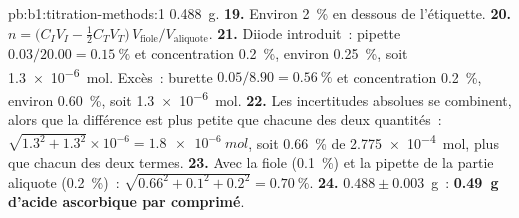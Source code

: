 \begin{solution}{pb:b1:titration-methods:1}
\qty{0.488}{g}.
\textbf{19.} Environ \qty{2}{\percent} en dessous de l'étiquette.
\textbf{20.} $n = \bigl(C_IV_I - \frac12C_TV_T\bigr)\,V_{\mathrm{fiole}}/V_{\mathrm{aliquote}}$.
\textbf{21.} Diiode introduit~: pipette $0.03/20.00 = \qty{0.15}{\percent}$
et concentration \qty{0.2}{\percent}, environ \qty{0.25}{\percent},
soit \qty{1.3e-6}{mol}. Excès~: burette $0.05/8.90 = \qty{0.56}{\percent}$
et concentration \qty{0.2}{\percent}, environ \qty{0.60}{\percent}, soit
\qty{1.3e-6}{mol}.
\textbf{22.} Les incertitudes absolues se combinent, alors que la
différence est plus petite que chacune des deux quantités~:
$\sqrt{1.3^2 + 1.3^2} \times 10^{-6} =
\qty{1.8e-6}{mol}$, soit \qty{0.66}{\percent} de \qty{2.775e-4}{mol},
plus que chacun des deux termes.
\textbf{23.} Avec la fiole (\qty{0.1}{\percent}) et la pipette de la
partie aliquote (\qty{0.2}{\percent})~:
$\sqrt{0.66^2 + 0.1^2 + 0.2^2} = \qty{0.70}{\percent}$.
\textbf{24.} $0.488 \pm 0.003$~g~: \textbf{\qty{0.49}{g} d'acide
ascorbique par comprimé}.
\end{solution}
